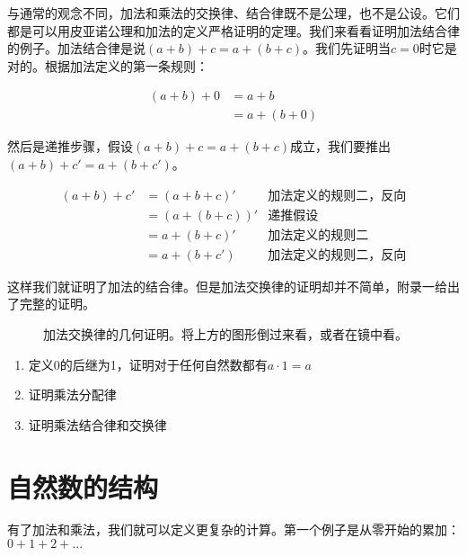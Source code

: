 \documentclass[UTF8]{article}
\begin{document}
与通常的观念不同，加法和乘法的交换律、结合律既不是公理，也不是公设。它们都是可以用皮亚诺公理和加法的定义严格证明的定理。我们来看看证明加法结合律的例子。加法结合律是说$(a + b) + c= a + (b + c)$。我们先证明当$c=0$时它是对的。根据加法定义的第一条规则：

\[
\begin{array}{rl}
(a + b) + 0 & = a + b \\
            & = a + (b + 0)
\end{array}
\]

然后是递推步骤，假设$(a + b) + c = a + (b + c)$成立，我们要推出$(a + b) + c' = a + (b + c')$。

\[
\begin{array}{rlr}
(a + b) + c' & = (a + b + c)' & \text{加法定义的规则二，反向} \\
             & = (a + (b + c))' & \text{递推假设} \\
             & = a + (b + c)' & \text{加法定义的规则二} \\
             & = a + (b + c') & \text{加法定义的规则二，反向}
\end{array}
\]

这样我们就证明了加法的结合律。但是加法交换律的证明却并不简单，附录一给出了完整的证明。

\begin{figure}[htbp]
\centering
{}
\caption{加法交换律的几何证明。将上方的图形倒过来看，或者在镜中看。}
\end{figure}

\begin{Exercise}
\begin{enumerate}
\item 定义0的后继为1，证明对于任何自然数都有$a \cdot 1 = a$
\item 证明乘法分配律
\item 证明乘法结合律和交换律
\end{enumerate}
\end{Exercise}

\section{自然数的结构}
有了加法和乘法，我们就可以定义更复杂的计算。第一个例子是从零开始的累加：$0 + 1 + 2 + ... $
\end{document}
